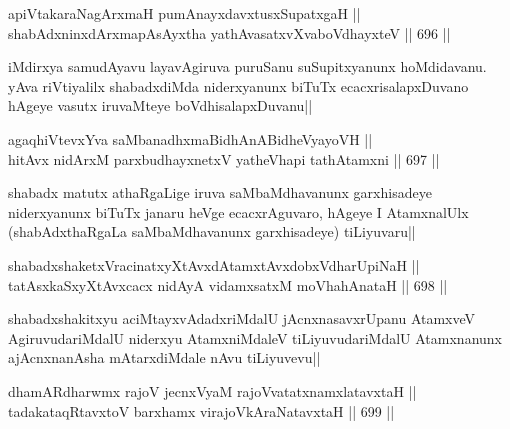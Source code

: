 
\begin{shl}
apiVtakaraNagArxmaH pumAnayxdavxtusxSupatxgaH || \\
shabAdxninxdArxmapAsAyxtha yathAvasatxvXvaboVdhayxteV ||  696 ||  
\end{shl}

\begin{artha} 
iMdirxya samudAyavu layavAgiruva puruSanu suSupitxyanunx hoMdidavanu. 
yAva riVtiyalilx shabadxdiMda niderxyanunx biTuTx ecacxrisalapxDuvano 
hAgeye vasutx iruvaMteye boVdhisalapxDuvanu||
\end{artha}


\begin{shl}
agaqhiVtevxYva saMbanadhxmaBidhAnABidheVyayoVH || \\
hitAvx nidArxM parxbudhayxnetxV yatheVhapi tathA\s \s tamxni ||  697 || 
\end{shl}

\begin{artha} 
shabadx matutx athaRgaLige iruva saMbaMdhavanunx garxhisadeye 
niderxyanunx biTuTx janaru heVge ecacxrAguvaro, hAgeye I AtamxnalUlx 
(shabAdxthaRgaLa saMbaMdhavanunx garxhisadeye) tiLiyuvaru||
\end{artha}

\begin{shl}
shabadxshaketxVracinatxyXtAvxdAtamxtAvxdobxVdharUpiNaH || \\
tatAsxkaSxyXtAvxcacx nidAyA vidamxsatxM moVhahAnataH ||  698 ||  
\end{shl}

\begin{artha} 
shabadxshakitxyu aciMtayxvAdadxriMdalU jAcnxnasavxrUpanu AtamxveV 
AgiruvudariMdalU niderxyu AtamxniMdaleV tiLiyuvudariMdalU 
Atamxnanunx ajAcnxnanAsha mAtarxdiMdale nAvu tiLiyuvevu||
\end{artha}


\begin{shl}
dhamARdharwmx rajoV jecnxVyaM rajoVvatatxnamxlatavxtaH || \\
tadakataqRtavxtoV barxhamx virajoV\s kAraNatavxtaH ||  699 ||  
\end{shl}

